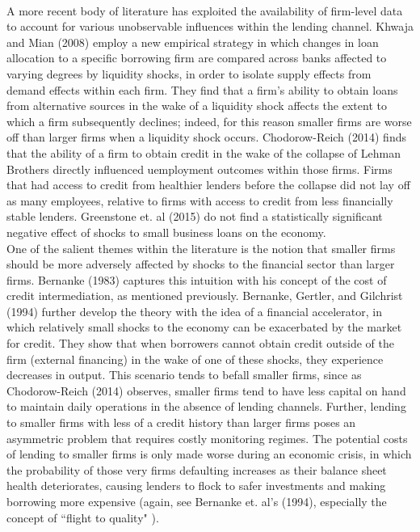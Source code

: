 \documentclass[letter,11pt]{article}
\begin{document}
{\\
\indent A more recent body of literature has exploited the availability of firm-level data to account for various unobservable influences within the lending channel. Khwaja and Mian (2008) employ a new empirical strategy in which changes in loan allocation to a specific borrowing firm are compared across banks affected to varying degrees by liquidity shocks, in order to isolate supply effects from demand effects within each firm. They find that a firm's ability to obtain loans from alternative sources in the wake of a liquidity shock affects the extent to which a firm subsequently declines; indeed, for this reason smaller firms are worse off than larger firms when a liquidity shock occurs. Chodorow-Reich (2014) finds that the ability of a firm to obtain credit in the wake of the collapse of Lehman Brothers directly influenced uemployment outcomes within those firms. Firms that had access to credit from healthier lenders before the collapse did not lay off as many employees, relative to firms with access to credit from less financially stable lenders. Greenstone et. al (2015) do not find a statistically significant negative effect of shocks to small business loans on the economy. 
\\
\indent One of the salient themes within the literature is the notion that smaller firms should be more adversely affected by shocks to the financial sector than larger firms. Bernanke (1983) captures this intuition with his concept of the cost of credit intermediation, as mentioned previously. Bernanke, Gertler, and Gilchrist (1994) further develop the theory with the idea of a financial accelerator, in which relatively small shocks to the economy can be exacerbated by the market for credit. They show that when borrowers cannot obtain credit outside of the firm (external financing) in the wake of one of these shocks, they experience decreases in output. This scenario tends to befall smaller firms, since as Chodorow-Reich (2014) observes, smaller firms tend to have less capital on hand to maintain daily operations in the absence of lending channels. Further, lending to smaller firms with less of a credit history than larger firms poses an asymmetric problem that requires costly monitoring regimes. The potential costs of lending to smaller firms is only made worse during an economic crisis, in which the probability of those very firms defaulting increases as their balance sheet health deteriorates, causing lenders to flock to safer investments and making borrowing more expensive (again, see Bernanke et. al's (1994), especially the concept of ``flight to quality" ).
}
\end{document}

